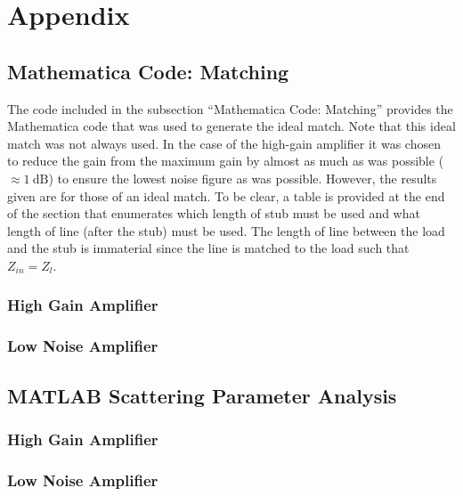 \section{Appendix}

\subsection{Mathematica Code: Matching}
The code included in the subsection ``Mathematica Code: Matching'' provides the
Mathematica code that was used to generate the ideal match. Note that this ideal
match was not always used. In the case of the high-gain amplifier it was chosen
to reduce the gain from the maximum gain by almost as much as was possible
($\approx \SI{1}{\deci\bel}$) to ensure the lowest noise figure as was possible.
However, the results given are for those of an ideal match. To be clear, a table
is provided at the end of the section that enumerates which length of stub must
be used and what length of line (after the stub) must be used. The length of
line between the load and the stub is immaterial since the line is matched to
the load such that $Z_{in} = Z_l$.

\subsubsection{High Gain Amplifier}

\subsubsection{Low Noise Amplifier}

\subsection{MATLAB Scattering Parameter Analysis}

\subsubsection{High Gain Amplifier}

\subsubsection{Low Noise Amplifier}
